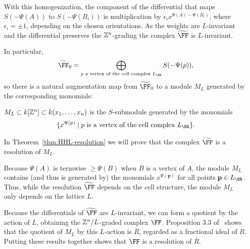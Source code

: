 \documentclass{amsart}
\begin{document}
With this homogenization, the component of the differential that maps $S(-\Psi(A))$ to $S(-\Psi(B_{i}))$ is multiplication by $\epsilon_{i}x^{\Psi(A) - \Psi(B_{i})}$, where
$\epsilon_{i} = \pm 1$, depending on the chosen orientations. As the weights are $L$-invariant
and the
differential preserves the $\mathbb Z^{n}$-grading the complex $\tF$ is $L$-invariant.



In particular,
$$
\tF_{0} = \bigoplus_{p \text{ a vertex of the cell complex }L_{\RR}}S(-\Psi(p)),
$$
so there is a natural augmentation map from $\tF_{0}$ to a module $M_{L}$ generated by the corresponding monomials:

\begin{defn}\label{def:M_{L}}
 $M_{L}\subset k[\mathbb Z^{n}]\subset k(x_{1}, \dots, x_{n})$ is the $S$-submodule generated by the monomials
 $$
 \{x^{\Psi(p)} \mid p \hbox{ is a vertex of the cell complex }L_{\RR}\}.
 $$
\end{defn}


In Theorem~\ref{thm:HHL-resolution} we will prove that the complex $\tF$ is a resolution of $M_L$.

\begin{remark}
 Because $\Psi(A)$ is termwise $\geq \Psi(B)$ when $B$ is a vertex of $A$, the module $M_{L}$ contains (and thus is generated by) the monomials $x^{\Psi(\mathbf{p})}$ for all points $\mathbf{p}\in L_{\RR}$. Thus, while the resolution $\tF$ depends on the cell structure, the module $M_L$ only depends on the lattice $L$.
\end{remark}

Because the differentials of $\tF$ are $L$-invariant, we can form a quotient by the action of $L$, obtaining the $\mathbb Z^{n}/L$-graded complex $\FF$. Proposition 3.3 of~\cite{BCHSY} shows  that the quotient of $M_L$ by this $L$-action is $\overline{R}$, regarded as a fractional ideal of $R$. Putting these results together shows that  $\FF$ is a resolution of $\overline R$.


\end{document}
